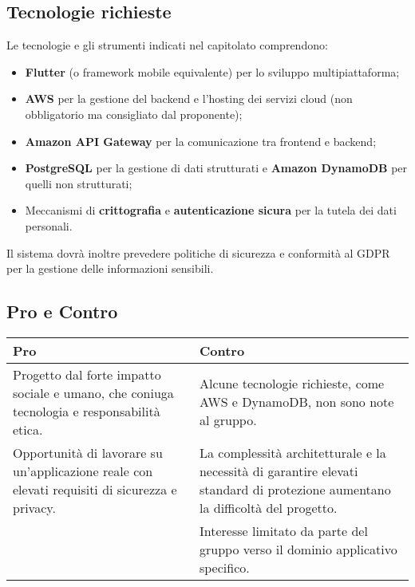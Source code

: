 \documentclass[a4paper,12pt]{article}
\begin{document}
{{    \subsection{Tecnologie richieste}
        Le tecnologie e gli strumenti indicati nel capitolato comprendono:
        \begin{itemize}
            \item \textbf{Flutter} (o framework mobile equivalente) per lo sviluppo multipiattaforma;
            \item \textbf{AWS} per la gestione del backend e l’hosting dei servizi cloud (non obbligatorio ma consigliato dal proponente);
            \item \textbf{Amazon API Gateway} per la comunicazione tra frontend e backend;
            \item \textbf{PostgreSQL} per la gestione di dati strutturati e \textbf{Amazon DynamoDB} per quelli non strutturati;
            \item Meccanismi di \textbf{crittografia} e \textbf{autenticazione sicura} per la tutela dei dati personali.
        \end{itemize}
        Il sistema dovrà inoltre prevedere politiche di sicurezza e conformità al GDPR per la gestione delle informazioni sensibili.
    

    \subsection{Pro e Contro}
        \begin{center}
            \begin{tabular}{|p{9cm}|p{5cm}|}
                \hline
                \textbf{Pro} & \textbf{Contro} \\
                \hline
                Progetto dal forte impatto sociale e umano, che coniuga tecnologia e responsabilità etica. & Alcune tecnologie richieste, come AWS e DynamoDB, non sono note al gruppo. \\
                \hline
                Opportunità di lavorare su un'applicazione reale con elevati requisiti di sicurezza e privacy. & La complessità architetturale e la necessità di garantire elevati standard di protezione aumentano la difficoltà del progetto. \\
                \hline
                & Interesse limitato da parte del gruppo verso il dominio applicativo specifico. \\
                \hline
            \end{tabular}
        \end{center}
    

}}
\end{document}
